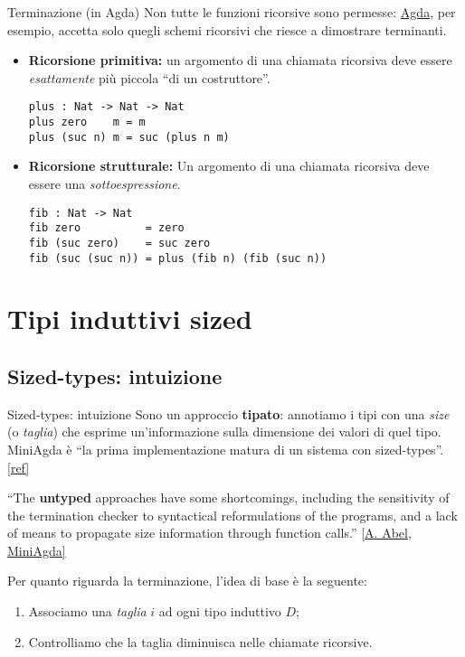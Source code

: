 \documentclass[t,aspectratio=169,10pt]{beamer}
\begin{document}
\begin{frame}[fragile]{Terminazione (in Agda)}
	Non tutte le funzioni ricorsive sono permesse: \href{https://wiki.portal.chalmers.se/agda/ReferenceManual/Totality\#Terminationchecking}{Agda}, per esempio,
	accetta solo quegli schemi ricorsivi che riesce a dimostrare
	terminanti.
	\begin{itemize}
		\item {{\bf Ricorsione primitiva:}
		      un argomento di una chiamata ricorsiva deve essere
			      {\it esattamente} più piccola ``di un costruttore''.
		      \begin{verbatim}
plus : Nat -> Nat -> Nat
plus zero    m = m
plus (suc n) m = suc (plus n m)
\end{verbatim}
		      }
		      \item{{\bf Ricorsione strutturale:}
		                  Un argomento di una chiamata ricorsiva deve essere una
			                  {\it sottoespressione}.
		                  \begin{verbatim}
fib : Nat -> Nat
fib zero          = zero
fib (suc zero)    = suc zero
fib (suc (suc n)) = plus (fib n) (fib (suc n))
		      \end{verbatim}
		            }
	\end{itemize}

\end{frame}

\section[induttivi sized]{Tipi induttivi sized}
\subsection{Sized-types: intuizione}
\begin{frame}{Sized-types: intuizione}
	Sono un approccio {\bf tipato}: annotiamo i tipi con una {\it size} (o
		{\it taglia}) che esprime un'informazione sulla dimensione dei valori di
	quel tipo. MiniAgda è ``la prima implementazione matura di un sistema con
	sized-types''. \href{https://arxiv.org/abs/1012.4896}{[ref]}

	\vskip15pt

	{
	\center
	``The {\bf untyped} approaches have some shortcomings, including
	the sensitivity of the termination checker to syntactical
	reformulations of the programs, and a lack of means to propagate
	size information through function calls.''
	\href{https://arxiv.org/abs/1012.4896}{[A. Abel, MiniAgda]}
	}

	\vskip15pt

	Per quanto riguarda la terminazione, l'idea di base è la seguente:
	\begin{enumerate}
		\item {Associamo una {\it taglia} $i$ ad ogni tipo induttivo $D$;}
		\item {Controlliamo che la taglia diminuisca nelle chiamate ricorsive.}
	\end{enumerate}
\end{frame}
\end{document}
